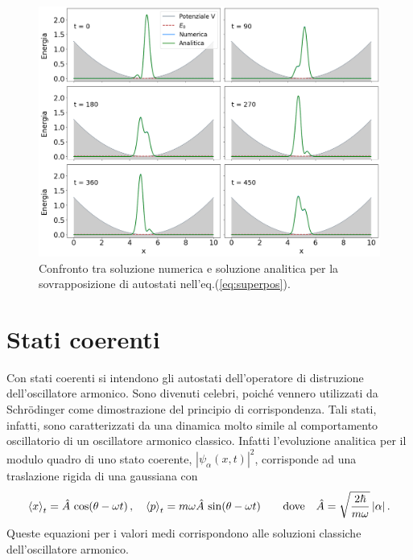 \documentclass[12pt]{report}
\begin{document}
\begin{figure}
    \centering
    \includegraphics[width = \textwidth]{immagini/superposition.png}
    \caption{ \textcolor{dark-gray}{Confronto tra soluzione numerica e soluzione analitica per la sovrapposizione di autostati nell'eq.(\ref{eq:superpos}).}}
    \label{fig:superpos}
\end{figure}


\section{Stati coerenti}
\label{sec:coherent}

Con stati coerenti \cite{CT:QM} si intendono gli autostati dell'operatore di distruzione dell'oscillatore armonico. Sono divenuti celebri, poiché vennero utilizzati da Schr\"odinger come dimostrazione del principio di corrispondenza. Tali stati, infatti, sono caratterizzati da una dinamica molto simile al comportamento oscillatorio di un oscillatore armonico classico. 
Infatti l'evoluzione analitica per il modulo quadro di uno stato coerente, $|\psi_{\alpha}(x, t)|^{2}$, corrisponde ad una traslazione rigida di una gaussiana con 
\begin{equation}
    \centering
    \expval{x}_{t} = \hat{A} \, \cos (\theta - \omega t) \, \text{,} \quad
    \expval{p}_{t} = m \omega \hat{A} \, \sin (\theta - \omega t) \qquad
    \text{dove} \quad \hat{A} = \sqrt{\frac{2 \hbar}{m \omega}} \,|\alpha| \, \text{.}
    \label{eq:coherent_an}
\end{equation}
Queste equazioni per i valori medi corrispondono alle soluzioni classiche dell'oscillatore armonico.
\end{document}
